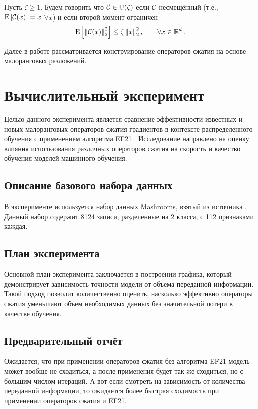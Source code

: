 \documentclass{article}
\begin{document}
\begin{definition}
Пусть $\zeta \geq 1$. Будем говорить что ${\cal C}\in \mathbb{U}(\zeta)$ если ${\cal C}$ несмещённый (т.е., ${{\rm E}}\left[{\cal C}(x)\right]=x$  $\forall x$) и если второй момент ограничен 
\begin{equation}
 {{\rm E}}\left[ \left\| {\cal C}(x) \right\|_2^2 \right] \leq \zeta  \left\| x \right\|_2^2, \qquad \forall x\in\mathbb{R}^d \,.
\end{equation} 

\end{definition}

Далее в работе рассматривается конструирование операторов сжатия на основе малоранговых разложений. 

\section{Вычислительный эксперимент}

Целью данного эксперимента является сравнение эффективности известных и новых малоранговых операторов сжатия градиентов в контексте распределенного обучения с применением алгоритма EF21 \citep{richtarik2021ef21}. Исследование направлено на оценку влияния использования различных операторов сжатия на скорость и качество обучения моделей машинного обучения.

\subsection{Описание базового набора данных}
В эксперименте используется набор данных Mashrooms, взятый из источника \citep{chang2011libsvm}. Данный набор содержит 8124 записи, разделенные на 2 класса, с 112 признаками каждая. 

\subsection{План эксперимента}
Основной план эксперимента заключается в построении графика, который демонстрирует зависимость точности модели от объема переданной информации. Такой подход позволит количественно оценить, насколько эффективно операторы сжатия уменьшают объем необходимых данных без значительной потери в качестве обучения.

\subsection{Предварительный отчёт}
Ожидается, что при применении операторов сжатия без алгоритма EF21 модель может вообще не сходиться, а после применения будет так же сходиться, но с большим числом итераций. А вот если смотреть на зависимость от количества переданной информации, то ожидается более быстрая сходимость при применении операторов сжатия и EF21.







\end{document}
